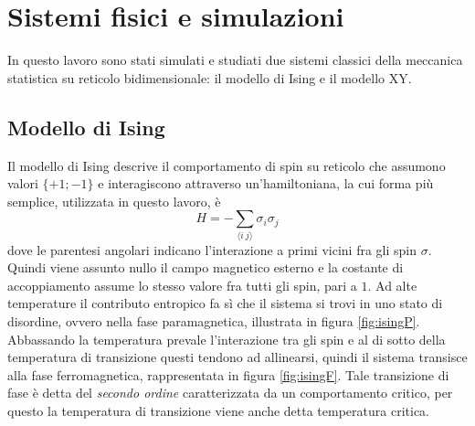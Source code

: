 \documentclass{article}
\begin{document}

\section{Sistemi fisici e simulazioni}
In questo lavoro sono stati simulati e studiati due sistemi classici della meccanica statistica su reticolo bidimensionale:  il modello di Ising e il modello XY.

\subsection{Modello di Ising}
Il modello di Ising descrive il comportamento di spin su reticolo che assumono valori $\{+1;-1\}$ e interagiscono attraverso un'hamiltoniana, la cui forma più semplice, utilizzata in questo lavoro, è
\begin{equation}
H=- \sum_{\langle i~j\rangle} \sigma_i\sigma_j
\end{equation}
dove le parentesi angolari indicano l'interazione a primi vicini fra gli spin $\sigma$.
Quindi viene assunto nullo il campo magnetico esterno e la costante di accoppiamento assume lo stesso valore fra tutti gli spin, pari a $1$.
Ad alte temperature il contributo entropico fa sì che il sistema si trovi in uno stato di disordine, ovvero nella fase paramagnetica, illustrata in figura \ref{fig:isingP}.
Abbassando la temperatura prevale l'interazione tra gli spin e al di sotto della temperatura di transizione questi tendono ad allinearsi, quindi il sistema transisce alla fase ferromagnetica, rappresentata in figura \ref{fig:isingF}.
Tale transizione di fase è detta del \emph{secondo ordine} caratterizzata da un comportamento critico, per questo la temperatura di transizione viene anche detta temperatura critica.
\end{document}
